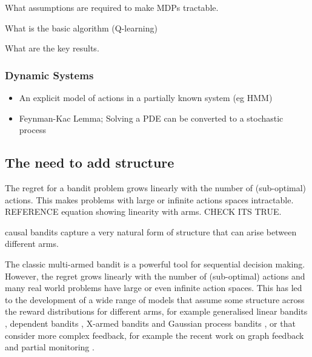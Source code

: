 What assumptions are required to make MDPs tractable. 

What is the basic algorithm (Q-learning)

What are the key results.

\subsubsection{Dynamic Systems}
\begin{itemize}
\item An explicit model of actions in a partially known system (eg HMM)
\item Feynman-Kac Lemma; Solving a PDE can be converted to a stochastic process
\end{itemize}







\subsection{The need to add structure}
The regret for a bandit problem grows linearly with the number of (sub-optimal) actions. This makes problems with large or infinite actions spaces intractable. REFERENCE equation showing linearity with arms. CHECK ITS TRUE. 

causal bandits capture a very natural form of structure that can arise between different arms. 

The classic multi-armed bandit is a powerful tool for sequential decision making. However, the regret grows linearly with the number of (sub-optimal) actions and many real world problems have large or even infinite action spaces. This has led to the development of a wide range of models that assume some structure across the reward distributions for different arms, for example generalised linear bandits \cite{filippi2010parametric}, dependent bandits \cite{Pandey2007}, X-armed bandits \cite{Bubeck2010} and Gaussian process bandits \cite{srinivas2009gaussian}, or that consider more complex feedback, for example the recent work on graph feedback \cite{Mannor2011,Lelarge2012,Alon2013,Buccapatnam2014,Kocak2014,Alon2015} and partial monitoring \cite{Piccolboni2001,Bartok2014}. 

